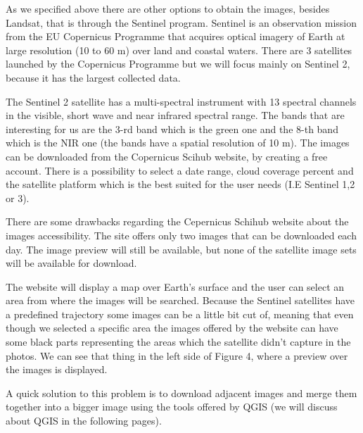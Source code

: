 \documentclass[12pt, a4paper]{report}
\begin{document}
\medskip

As we specified above there are other options to obtain the images, besides Landsat, that is through the Sentinel program. Sentinel is an observation mission from the EU Copernicus Programme that acquires optical imagery of Earth at large resolution (10 to 60 m) over land and coastal waters. There are 3 satellites launched by the Copernicus Programme but we will focus mainly on Sentinel 2, because it has the largest collected data. 
\par 

The Sentinel 2 satellite has a multi-spectral instrument with 13 spectral channels in the visible, short wave and near infrared spectral range. The bands that are interesting for us are the 3-rd band which is the green one and the 8-th band which is the NIR one (the bands have a spatial resolution of 10 m). The images  can be downloaded from the Copernicus Scihub website, by creating a free account. There is a possibility to select a date range, cloud coverage percent and the satellite platform which is the best suited for the user needs (I.E Sentinel 1,2 or 3). 
\par 

There are some drawbacks regarding the Cepernicus Schihub website about the images accessibility. The site offers only two images that can be downloaded each day. The image preview will still be available, but none of the satellite image sets will be available for download. 
\par 

The website will display a map over Earth's surface and the user can select an area from where the images will be searched. Because the Sentinel satellites have a predefined trajectory some images can be a little bit cut of, meaning that even though we selected a specific area the images offered by the website can have some black parts representing the areas which the satellite didn't capture in the photos. We can see that thing in the left side of Figure 4, where a preview over the images is displayed.
\par 

A quick solution to this problem is to download adjacent images and merge them together into a bigger image using the tools offered by QGIS (we will discuss about QGIS in the following pages).

\newpage
\bigskip
\end{document}

